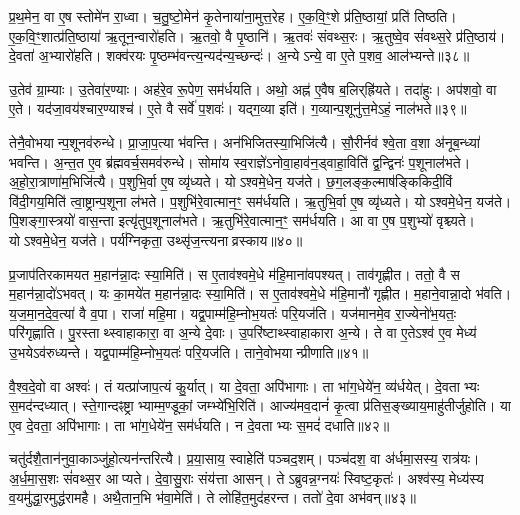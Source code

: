 प्र॒थ॒मेन॒ वा ए॒ष स्तोमे॑न रा॒ध्वा।
च॒तु॒ष्टो॒मेन॑ कृ॒तेनाया॑ना॒मुत्त॒रेह\sn{}।
ए॒क॒वि॒ꣳ॒शे प्र॑ति॒ष्ठायां॒ प्रति॑ तिष्ठति।
ए॒क॒वि॒ꣳ॒शात्प्र॑ति॒ष्ठाया॑ ऋ॒तून॒न्वारो॑हति।
ऋ॒तवो॒ वै पृ॒ष्ठानि॑।
ऋ॒तवः॑ संवथ्स॒रः।
ऋ॒तुष्वे॒व सं॑वथ्स॒रे प्र॑ति॒ष्ठाय॑।
दे॒वता॑ अ॒भ्यारो॑हति।
शक्व॑रयः पृ॒ष्ठम्भ॑वन्त्य॒न्यद॑न्य॒च्छन्दः॑।
अ॒न्ये\-ऽन्ये॒ वा ए॒ते प॒शव॒ आल॑भ्यन्ते॥३८॥

उ॒तेव॑ ग्रा॒म्याः।
उ॒तेवा॑र॒ण्याः।
अह॑रे॒व रू॒पेण॒ सम॑र्धयति।
अथो॒ अह्न॑ ए॒वैष ब॒लिर्‌\mbox{}ह्रि॑यते।
तदा॑हुः।
अप॑शवो॒ वा ए॒ते।
यद॑जा॒वय॑श्चार॒ण्याश्च॑।
ए॒ते वै सर्वे॑ प॒शवः॑।
यद्ग॒व्या इति॑।
ग॒व्यान्प॒शूनु॑त्त॒मेऽहं॒ नाल॑भते॥३९॥

तेनै॒वोभयान्प॒शूनव॑रुन्धे।
प्रा॒जा॒प॒त्या भ॑वन्ति।
अन॑भिजितस्या॒भिजि॑त्यै।
सौ॒रीर्नव॑ श्वे॒ता व॒शा अ॑नूब॒न्ध्या॑ भवन्ति।
अ॒न्त॒त ए॒व ब्र॑ह्मवर्च॒समव॑रुन्धे।
सोमा॑य स्व॒राज्ञे॑\-ऽनोवा॒हाव॑न॒ड्वाहा॒विति॑ द्व॒न्द्विनः॑ प॒शूनाल॑भते।
अ॒हो॒रा॒त्राणा॑म॒भिजि॑त्यै।
प॒शुभि॒र्वा ए॒ष व्यृ॑ध्यते।
योऽश्वमे॒धेन॒ यज॑ते।
छ॒ग॒लङ्क॒ल्माष॑ङ्किकिदी॒विं वि॑दी॒गय॒मिति॑ त्वा॒ष्ट्रान्प॒शूना ल॑भते।
प॒शुभि॑रे॒वात्मान॒ꣳ॒ सम॑र्धयति।
ऋ॒तुभि॒र्वा ए॒ष व्यृ॑ध्यते।
योऽश्वमे॒धेन॒ यज॑ते।
पि॒शङ्गा॒स्त्रयो॑ वास॒न्ता इत्यृ॑तुप॒शूनाल॑भते।
ऋ॒तुभि॑रे॒वात्मान॒ꣳ॒ सम॑र्धयति।
आ वा ए॒ष प॒शुभ्यो॑ वृश्च्यते।
योऽश्वमे॒धेन॒ यज॑ते।
पर्य॑ग्निकृता॒ उथ्सृ॑ज॒न्त्यनाव्रस्काय॥४०॥\anuvakamend[ल॒भ्य॒न्ते॒ ल॒भ॒ते॒ त्वा॒ष्ट्रान्प॒शूनाल॑भते॒\-ऽष्टौ च॑]

प्र॒जाप॑तिरकामयत म॒हान॑न्ना॒दः स्या॒मिति॑।
स ए॒ताव॑श्वमे॒धे म॑हि॒माना॑वपश्यत्।
ताव॑गृह्णीत।
ततो॒ वै स म॒हान॑न्ना॒दो॑\-ऽभवत्।
यः का॒मये॑त म॒हान॑न्ना॒दः स्या॒मिति॑।
स ए॒ताव॑श्वमे॒धे म॑हि॒मानौ॑ गृह्णीत।
म॒हाने॒वान्ना॒दो भ॑वति।
य॒ज॒मा॒न॒दे॒व॒त्या॑ वै व॒पा।
राजा॑ महि॒मा।
यद्व॒पाम्म॑हि॒म्नोभ॒यतः॑ परि॒यज॑ति।
यज॑मानमे॒व रा॒ज्येनो॑भ॒यतः॒ परि॑गृह्णाति।
पु॒रस्ताथ्स्वाहाकारा॒ वा अ॒न्ये दे॒वाः।
उ॒परि॑ष्टाथ्स्वाहाकारा अ॒न्ये।
ते वा ए॒ते\-ऽश्व॑ ए॒व मेध्य॑ उ॒भये\-ऽव॑रुध्यन्ते।
यद्व॒पाम्म॑हि॒म्नोभ॒यतः॑ परि॒यज॑ति।
ताने॒वोभयान्प्रीणाति॥४१॥\anuvakamend[प॒रि॒यज॑ति॒ षट्च॑]

वै॒श्व॒दे॒वो वा अश्वः॑।
तं यत्प्रा॑जाप॒त्यं कु॒र्यात्।
या दे॒वता॒ अपि॑भागाः।
ता भा॑ग॒धेये॑न॒ व्य॑र्धयेत्।
दे॒वताभ्यः स॒मद॑न्दध्यात्।
स्ते॒गान्दꣴष्ट्राभ्याम्म॒ण्डूकां॒ जम्भ्ये॑भि॒रिति॑।
आज्य॑मव॒दानं॑ कृ॒त्वा प्र॑तिस॒ङ्ख्याय॒माहु॑तीर्जुहोति।
या ए॒व दे॒वता॒ अपि॑भागाः।
ता भा॑ग॒धेये॑न॒ सम॑र्धयति।
न दे॒वताभ्यः स॒मदं॑ दधाति॥४२॥

चतु॑र्दशै॒तान॑नुवा॒काञ्जु॑हो॒त्यन॑न्तरित्यै।
प्र॒या॒साय॒ स्वाहेति॑ पञ्चद॒शम्।
पञ्च॑दश॒ वा अ॑र्धमा॒सस्य॒ रात्र॑यः।
अ॒र्ध॒मा॒स॒शः सं॑वथ्स॒र आप्यते।
दे॒वा॒सु॒राः संय॑त्ता आसन्।
तेऽब्रुवन्न॒ग्नयः॑ स्विष्ट॒कृतः॑।
अश्व॑स्य॒ मेध्य॑स्य व॒यमु॑द्धा॒रमुद्ध॑रामहै।
अथै॒तान॒भि भ॑वा॒मेति॑।
ते लोहि॑त॒मुद॑हरन्त।
ततो॑ दे॒वा अभ॑वन्॥४३॥

